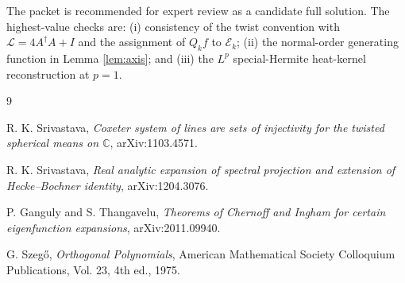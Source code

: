 \documentclass[11pt]{article}
\newcommand{\C}{\mathbb C}
\newcommand{\cE}{\mathcal E}
\newcommand{\ad}{A^{\dagger}}
\begin{document}
The packet is recommended for expert review as a candidate full solution.
The highest-value checks are: (i) consistency of the twist convention with
$\mathcal L=4\ad A+I$ and the assignment of $Q_kf$ to $\cE_k$;
(ii) the normal-order generating function in Lemma \ref{lem:axis}; and
(iii) the $L^p$ special-Hermite heat-kernel reconstruction at $p=1$.

\begin{thebibliography}{9}

R. K. Srivastava,
\emph{Coxeter system of lines are sets of injectivity for the twisted
spherical means on $\C$}, arXiv:1103.4571.

R. K. Srivastava,
\emph{Real analytic expansion of spectral projection and extension of
Hecke--Bochner identity}, arXiv:1204.3076.

P. Ganguly and S. Thangavelu,
\emph{Theorems of Chernoff and Ingham for certain eigenfunction expansions},
arXiv:2011.09940.

G. Szeg\H{o}, \emph{Orthogonal Polynomials}, American Mathematical Society
Colloquium Publications, Vol. 23, 4th ed., 1975.

\end{thebibliography}
\end{document}
